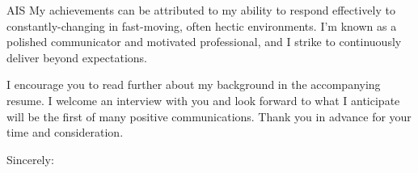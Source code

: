 \documentclass[
    jphafner,
    fontsize=11pt,
    foldmarks=false,
    pagenumber=false,
    addrfield=true,
]{scrlttr2}
\begin{document}
\begin{letter}{AIS}
My achievements can be attributed to my ability to respond effectively to constantly-changing in fast-moving, often hectic environments. 
    I'm known as a polished communicator and motivated professional, and I strike to continuously deliver beyond expectations.


I encourage you to read further about my background in the accompanying resume. 
    I welcome an interview with you and look forward to what I anticipate will be the first of many positive communications. 
    Thank you in advance for your time and consideration.



\closing{Sincerely:}
\end{letter}
\end{document}

